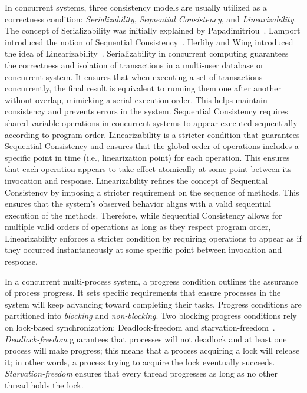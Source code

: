 In concurrent systems, three consistency models are usually utilized as a correctness condition: \textit{Serializability}, \textit{Sequential Consistency}, and \textit{Linearizability}. The concept of Serializability was initially explained by Papadimitriou~\cite{DBLP_journals_jacm_Papadimitriou79b}. Lamport introduced the notion of Sequential Consistency~\cite{lamport1979how}. Herlihy and Wing introduced the idea of Linearizability~\cite{DBLP_journals_toplas_HerlihyW90}.
Serializability in concurrent computing guarantees the correctness and isolation of transactions in a multi-user database or concurrent system. It ensures that when executing a set of transactions concurrently, the final result is equivalent to running them one after another without overlap, mimicking a serial execution order. This helps maintain consistency and prevents errors in the system. 
Sequential Consistency requires shared variable operations in concurrent systems to appear executed sequentially according to program order. Linearizability is a stricter condition that guarantees Sequential Consistency and ensures that the global order of operations includes a specific point in time (i.e., linearization point) for each operation. This ensures that each operation appears to take effect atomically at some point between its invocation and response. Linearizability refines the concept of Sequential Consistency by imposing a stricter requirement on the sequence of methods. This ensures that the system's observed behavior aligns with a valid sequential execution of the methods. Therefore, while Sequential Consistency allows for multiple valid orders of operations as long as they respect program order, Linearizability enforces a stricter condition by requiring operations to appear as if they occurred instantaneously at some specific point between invocation and response. 

In a concurrent multi-process system, a progress condition outlines the assurance of process progress. It sets specific requirements that ensure processes in the system will keep advancing toward completing their tasks. Progress conditions are partitioned into \textit{blocking} and \textit{non-blocking}. Two blocking progress conditions rely on lock-based synchronization: Deadlock-freedom and starvation-freedom~\cite{DBLP_books_daglib_0020056}. \textit{Deadlock-freedom} guarantees that processes will not deadlock and at least one process will make progress; this means that a process acquiring a lock will release it; in other words, a process trying to acquire the lock eventually succeeds. \textit{Starvation-freedom} ensures that every thread progresses as long as no other thread holds the lock.

